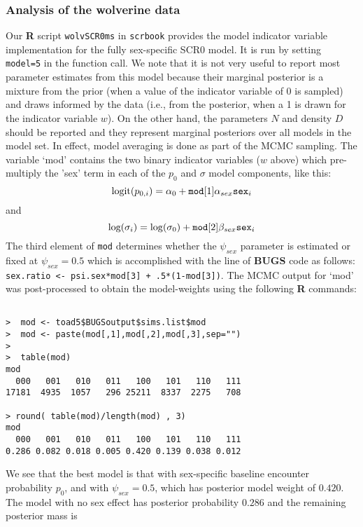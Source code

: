\subsubsection{Analysis of the wolverine data}

Our {\bf R} script \mbox{\tt wolvSCR0ms} in \mbox{\tt scrbook}
provides the model indicator variable implementation for the fully
sex-specific SCR0 model.  It is run by setting \mbox{\tt model=5} in
the function call. We note that it is not very useful to report most
parameter estimates from this model because their marginal posterior
is a mixture from the prior (when a value of the indicator variable of
0 is sampled) and draws informed by the data (i.e., from the
posterior, when a 1 is drawn for the indicator variable $w$).
 On the other hand, the parameters
$N$ and density $D$ should be reported and they represent marginal
posteriors over all models in the model set. In effect, model
averaging is done as part of the MCMC sampling.  The variable `mod'
contains the two binary indicator variables ($w$ above) which
pre-multiply the 'sex' term in each of the $p_{0}$ and $\sigma$ model
components, like this:
\[
 \mbox{logit}(p_{0,i}) = \alpha_{0} + \mbox{\tt mod}[1] \alpha_{sex} \mbox{\tt sex}_{i}
\]
and
\[
 \mbox{log}(\sigma_{i}) = \log(\sigma_{0}) + \mbox{\tt mod}[2] \beta_{sex} \mbox{\tt sex}_{i}
\]
The third element of \mbox{\tt mod} determines whether the
$\psi_{sex}$ parameter is estimated or fixed at $\psi_{sex} =
0.5$ which is accomplished with the line of {\bf BUGS} code as
follows:
\newline 
\mbox{\tt sex.ratio <- psi.sex*mod[3] + .5*(1-mod[3])}.
The MCMC output for `mod' was post-processed to obtain the
model-weights using the following  {\bf R} commands:
\begin{verbatim}

>  mod <- toad5$BUGSoutput$sims.list$mod
>  mod <- paste(mod[,1],mod[,2],mod[,3],sep="")
>
>  table(mod)
mod
  000   001   010   011   100   101   110   111
17181  4935  1057   296 25211  8337  2275   708

> round( table(mod)/length(mod) , 3)
mod
  000   001   010   011   100   101   110   111
0.286 0.082 0.018 0.005 0.420 0.139 0.038 0.012

\end{verbatim}
We see that the best model is that with sex-specific baseline
encounter probability $p_{0}$, and with $\psi_{sex} = 0.5$, which has
posterior model weight of $0.420$. The model with no sex effect has
posterior probability $0.286$ and the remaining posterior mass is
